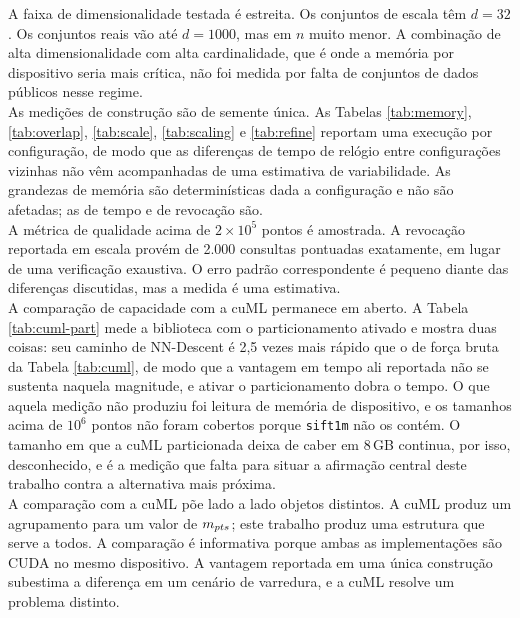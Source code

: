 A faixa de dimensionalidade testada é estreita. Os conjuntos de escala têm $d = 32$. Os conjuntos reais vão até $d = 1000$, mas em $n$ muito menor. A combinação de alta dimensionalidade com alta cardinalidade, que é onde a memória por dispositivo seria mais crítica, não foi medida por falta de conjuntos de dados públicos nesse regime.\\

As medições de construção são de semente única. As Tabelas \ref{tab:memory}, \ref{tab:overlap}, \ref{tab:scale}, \ref{tab:scaling} e \ref{tab:refine} reportam uma execução por configuração, de modo que as diferenças de tempo de relógio entre configurações vizinhas não vêm acompanhadas de uma estimativa de variabilidade. As grandezas de memória são determinísticas dada a configuração e não são afetadas; as de tempo e de revocação são.\\

A métrica de qualidade acima de $2 \times 10^5$ pontos é amostrada. A revocação reportada em escala provém de 2.000 consultas pontuadas exatamente, em lugar de uma verificação exaustiva. O erro padrão correspondente é pequeno diante das diferenças discutidas, mas a medida é uma estimativa.\\

A comparação de capacidade com a cuML permanece em aberto. A Tabela \ref{tab:cuml-part} mede a biblioteca com o particionamento ativado e mostra duas coisas: seu caminho de NN-Descent é 2,5 vezes mais rápido que o de força bruta da Tabela \ref{tab:cuml}, de modo que a vantagem em tempo ali reportada não se sustenta naquela magnitude, e ativar o particionamento dobra o tempo. O que aquela medição não produziu foi leitura de memória de dispositivo, e os tamanhos acima de $10^6$ pontos não foram cobertos porque \texttt{sift1m} não os contém. O tamanho em que a cuML particionada deixa de caber em 8\,GB continua, por isso, desconhecido, e é a medição que falta para situar a afirmação central deste trabalho contra a alternativa mais próxima.\\

A comparação com a cuML põe lado a lado objetos distintos. A cuML produz um agrupamento para um valor de $m_{pts}$; este trabalho produz uma estrutura que serve a todos. A comparação é informativa porque ambas as implementações são \ac{CUDA} no mesmo dispositivo. A vantagem reportada em uma única construção subestima a diferença em um cenário de varredura, e a cuML resolve um problema distinto.\\

